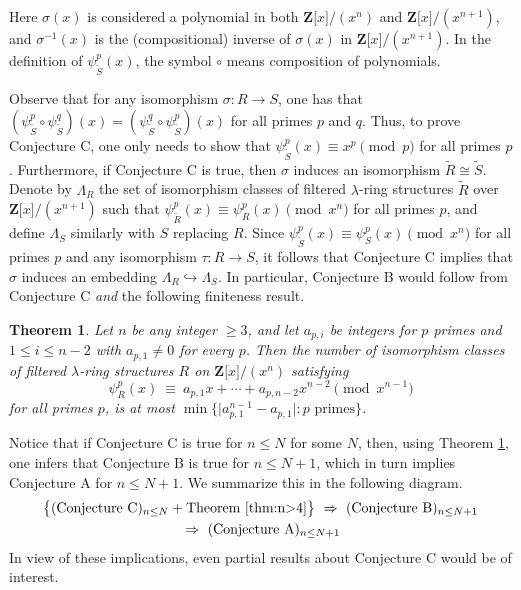\documentclass[reqno,11pt]{amsart}
\numberwithin{equation}{subsection}  %
\newtheorem{thm}[subsection]{Theorem}
\newcommand{\bZ}{\mathbf{Z}}
\begin{document}
Here $\sigma(x)$ is considered a polynomial in both $\bZ \lbrack x \rbrack/(x^{n})$ and $\bZ \lbrack x \rbrack/(x^{n+1})$, and $\sigma^{-1}(x)$ is the (compositional) inverse of $\sigma(x)$ in $\bZ \lbrack x \rbrack/(x^{n+1})$.  In the definition of $\psi^p_{\tilde{S}}(x)$, the symbol $\circ$ means composition of polynomials.


Observe that for any isomorphism $\sigma \colon R \to S$, one has that $(\psi^p_{\tilde{S}} \circ \psi^q_{\tilde{S}})(x) = (\psi^q_{\tilde{S}} \circ \psi^p_{\tilde{S}})(x)$ for all primes $p$ and $q$.  Thus, to prove Conjecture C, one only needs to show that $\psi^p_{\tilde{S}}(x) \equiv x^p \pmod{p}$ for all primes $p$.  Furthermore, if Conjecture C is true, then $\sigma$ induces an isomorphism $\tilde{R} \cong \tilde{S}$.  Denote by $\Lambda_R$ the set of isomorphism classes of filtered $\lambda$-ring structures $\tilde{R}$ over $\bZ \lbrack x \rbrack/(x^{n+1})$ such that $\psi^p_{\tilde{R}}(x) \equiv \psi^p_R(x) \pmod{x^n}$ for all primes $p$, and define $\Lambda_S$ similarly with $S$ replacing $R$.  Since $\psi^p_{\tilde{S}}(x) \equiv \psi^p_S(x) \pmod{x^n}$ for all primes $p$ and any isomorphism $\tau \colon R \to S$, it follows that Conjecture C implies that $\sigma$ induces an embedding $\Lambda_R \hookrightarrow \Lambda_S$.  In particular, Conjecture B would follow from Conjecture C \emph{and} the following finiteness result.


\medskip
\begin{thm}
\label{thm:n>4}
Let $n$ be any integer $\geq 3$, and let $a_{p,i}$ be integers for $p$ primes and $1 \leq i \leq n - 2$ with $a_{p,1} \not= 0$ for every $p$.  Then the number of isomorphism classes of filtered $\lambda$-ring structures $R$ on $\bZ \lbrack x \rbrack/(x^n)$ satisfying
   \begin{equation}
   \label{eq:extension}
   \psi^p_R(x) ~\equiv~ a_{p,1}x + \cdots + a_{p,n-2}x^{n-2} \pmod{x^{n-1}}
   \end{equation}
for all primes $p$, is at most $\min\bigl\lbrace\vert a_{p,1}^{n-1} - a_{p,1} \vert \colon p \text{ primes}\bigr\rbrace$.
\end{thm}


Notice that if Conjecture C is true for $n \leq N$ for some $N$, then, using Theorem \ref{thm:n>4}, one infers that Conjecture B is true for $n \leq N + 1$, which in turn implies Conjecture A for $n \leq N + 1$.  We summarize this in the following diagram.
   \begin{multline*}
   \bigl\lbrace (\text{Conjecture C})_{n \leq N} + \text{Theorem }\ref{thm:n>4} \bigr\rbrace
   ~\Rightarrow~ (\text{Conjecture B})_{n \leq N + 1} \\
   ~\Rightarrow~ (\text{Conjecture A})_{n \leq N + 1}
   \end{multline*}
In view of these implications, even partial results about Conjecture C would be of interest.  
\end{document}
